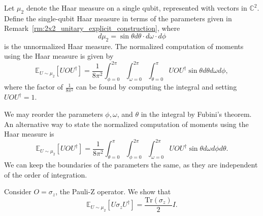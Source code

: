 \begin{definition}\label{def:single_qubit_haar_measure}
    Let $\mu_{2}$ denote the Haar measure on a single qubit, represented with vectors in $\mathbb{C}^{2}$.
    Define the {single-qubit Haar measure} in terms of the parameters given in Remark~\ref{rm:2x2_unitary_explicit_construction}, where
    \begin{equation}
        d\mu_{2} = \sin{\theta} d\theta \cdot d\omega \cdot d\phi
    \end{equation}
    is the unnormalized Haar measure.
    The normalized computation of moments using the Haar measure is given by
    \begin{equation}\label{eq:normalized_haar_meas}
       \mathbb{E}_{U \sim \mu_{2}} [U O U^{\dagger}] = \frac{1}{8\pi^2} \int_{\phi = 0}^{2\pi} \int_{\omega = 0}^{2\pi} \int_{\theta = 0}^{\pi} U O U^{\dagger} \sin{\theta} d\theta d\omega d\phi,
    \end{equation}
    where the factor of $\frac{1}{8\pi^2}$ can be found by computing the integral and setting $UOU^{\dagger} =1$.
\end{definition}

\begin{remark}
    We may reorder the parameters $\phi, \omega$, and $\theta$ in the integral by Fubini's theorem.
    An alternative way to state the normalized computation of moments using the Haar measure is
    \begin{equation}
        \mathbb{E}_{U \sim \mu_{2}} [U O U^{\dagger}] = \frac{1}{8\pi^2} \int_{\theta = 0}^{\pi} \int_{\phi = 0}^{2\pi} \int_{\omega = 0}^{2\pi} U O U^{\dagger} \sin{\theta} d\omega d\phi d\theta.
    \end{equation}
    We can keep the boundaries of the parameters the same, as they are independent of the order of integration.
\end{remark}


\begin{theorem}
    Consider $O = \sigma_{z}$, the Pauli-Z operator.
    We show that
    \begin{equation}
        \mathbb{E}_{U \sim \mu_{2}} [U\sigma_{z}U^{\dagger}] = \frac{\text{Tr}(\sigma_{z})}{2} I.
    \end{equation}
\end{theorem}

